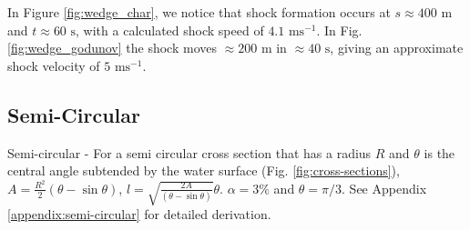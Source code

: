 \documentclass[12pt]{article}
\begin{document}
In Figure \ref{fig:wedge_char}, we notice that shock formation occurs at $s\approx 400\text{ m}$ and $t\approx 60\text{ s}$, with a calculated shock speed of $ 4.1\text{ ms}^{-1}$. In Fig. \ref{fig:wedge_godunov} the shock moves $\approx200\text{ m}$ in $\approx 40 \text{ s}$, giving an approximate shock velocity of $ 5\text{ ms}^{-1}$.

\subsection{Semi-Circular}
Semi-circular - For a semi circular cross section that has a radius $R$ and $\theta$ is the central angle subtended by the water surface (Fig. \ref{fig:cross-sections}), $A = \frac{R^2}{2}\left(\theta - \sin\theta\right)$, $l = \sqrt{\frac{2A}{\left(\theta - \sin\theta\right)}}\theta$. $\alpha = 3\%$ and $\theta = \pi/3$. See Appendix \ref{appendix:semi-circular} for detailed derivation.
\end{document}
